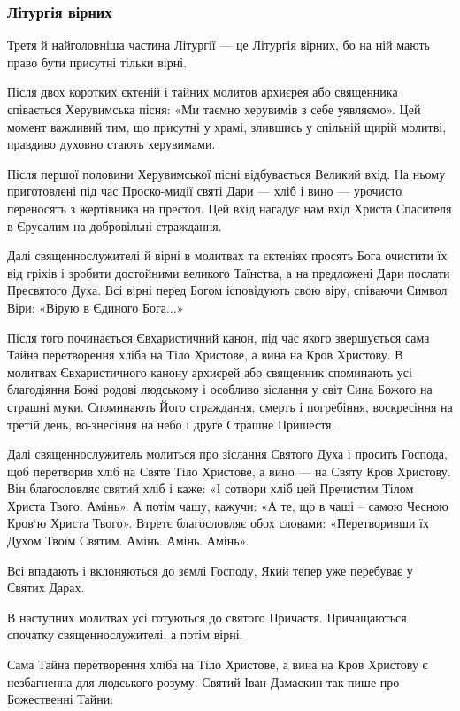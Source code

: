 \documentclass[main.tex]{subfiles}
\begin{document}
\subsubsection{Літургія вірних}

Третя й найголовніша частина Літургії — це Літургія вірних, бо на ній мають право бути присутні тільки вірні.

Після двох коротких єктеній і тайних молитов архиєрея або священника співається Херувимська пісня: «Ми таємно херувимів з себе уявляємо». Цей момент важливий тим, що присутні у храмі, злившись у спільній щирій молитві, правдиво духовно стають херувимами.

Після першої половини Херувимської пісні відбувається Великий вхід. На ньому приготовлені під час Проско-мидії святі Дари — хліб і вино — урочисто переносять з жертівника на престол. Цей вхід нагадує нам вхід Христа Спасителя в Єрусалим на добровільні страждання.

Далі священнослужителі й вірні в молитвах та єктеніях просять Бога очистити їх від гріхів і зробити достойними великого Таїнства, а на предложені Дари послати Пресвятого Духа. Всі вірні перед Богом ісповідують свою віру, співаючи Символ Віри: «Вірую в Єдиного Бога...»

Після того починається Євхаристичний канон, під час якого звершується сама Тайна перетворення хліба на Тіло Христове, а вина на Кров Христову. В молитвах Євхаристичного канону архиєрей або священник споминають усі благодіяння Божі родові людському і особливо зіслання у світ Сина Божого на страшні муки. Споминають Його страждання, смерть і погребіння, воскресіння на третій день, во-знесіння на небо і друге Страшне Пришестя.

Далі священнослужитель молиться про зіслання Святого Духа і просить Господа, щоб перетворив хліб на Святе Тіло Христове, а вино — на Святу Кров Христову. Він благословляє святий хліб і каже: «І сотвори хліб цей Пречистим Тілом Христа Твого. Амінь». А потім чашу, кажучи: «А те, що в чаші -- самою Чесною Кров`ю Христа Твого». Втретє благословляє обох словами: «Перетворивши їх Духом Твоїм Святим. Амінь. Амінь. Амінь».

Всі впадають і вклоняються до землі Господу, Який тепер уже перебуває у Святих Дарах.

В наступних молитвах усі готуються до святого Причастя. Причащаються спочатку священнослужителі, а потім вірні.

Сама Тайна перетворення хліба на Тіло Христове, а вина на Кров Христову є незбагненна для людського розуму. Святий Іван Дамаскин так пише про Божественні Тайни:
\end{document}
